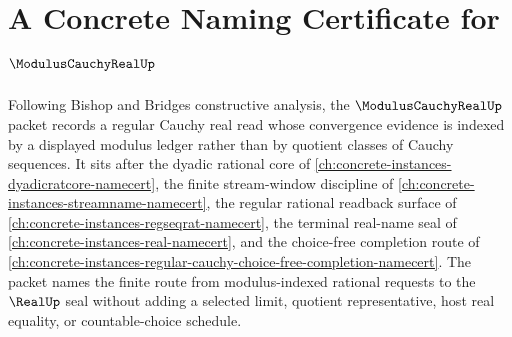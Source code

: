 \chapter{A Concrete Naming Certificate for $\ModulusCauchyRealUp$}
\label{ch:concrete-instances-modulus-cauchy-real-namecert}

Following Bishop and Bridges constructive analysis, the $\ModulusCauchyRealUp$ packet records a regular Cauchy real read whose convergence evidence is indexed by a displayed modulus ledger rather than by quotient classes of Cauchy sequences. It sits after the dyadic rational core of \autoref{ch:concrete-instances-dyadicratcore-namecert}, the finite stream-window discipline of \autoref{ch:concrete-instances-streamname-namecert}, the regular rational readback surface of \autoref{ch:concrete-instances-regseqrat-namecert}, the terminal real-name seal of \autoref{ch:concrete-instances-real-namecert}, and the choice-free completion route of \autoref{ch:concrete-instances-regular-cauchy-choice-free-completion-namecert}. The packet names the finite route from modulus-indexed rational requests to the $\RealUp$ seal without adding a selected limit, quotient representative, host real equality, or countable-choice schedule.

